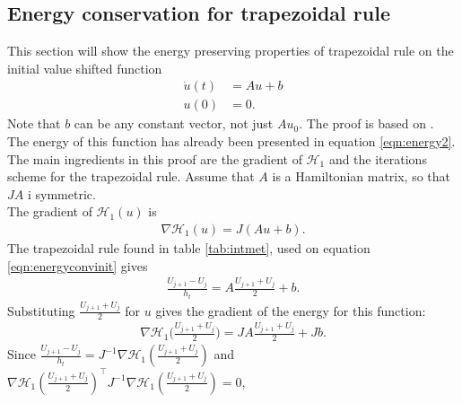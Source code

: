 \subsection{Energy conservation for trapezoidal rule} %
This section will show the energy preserving properties of trapezoidal rule on the initial value shifted function
\begin{equation}
\begin{aligned}
\dot{u}(t)& = Au + b \\
u(0)& = 0.
\end{aligned}
\label{eqn:energyconvinit}
\end{equation}
\noindent Note that $b$ can be any constant vector, not just $A u_0$. The proof is based on \cite{convtrap}.
The energy of this function has already been presented in equation \eqref{eqn:energy2}. The main ingredients in this proof are the gradient of $\mathcal{H}_1$ and the iterations scheme for the trapezoidal rule. Assume that $A$ is a Hamiltonian matrix, so that $JA$ i symmetric.\\ 
The gradient of $\mathcal{H}_1(u)$ is 
\begin{equation*}
\begin{aligned}
\nabla \mathcal{H}_1(u) = J (Au + b) .
\end{aligned}
\end{equation*}
\noindent The trapezoidal rule found in table \ref{tab:intmet}, used on equation \eqref{eqn:energyconvinit} gives 
\begin{equation*}
\begin{aligned}
\frac{U_{j+1} - U_j}{h_t} = A \frac{U_{j+1}  + U_j}{2} + b.
\end{aligned}
\end{equation*}
\noindent Substituting $\frac{U_{j+1}  + U_j}{2} $ for $u$ gives the gradient of the energy for this function:
\begin{equation*}
\begin{aligned}
\nabla \mathcal{H}_1 \Big(\frac{U_{j+1}  + U_j}{2}\Big) = JA \frac{U_{j+1}  + U_j}{2} + J b.
\end{aligned}
\end{equation*}
\noindent Since
$\frac{ U_{j+1} - U_j}{h_t} = J^{-1} \nabla \mathcal{H}_1( \frac{U_{j+1}  + U_j}{2} ) $
\noindent and
$\nabla \mathcal{H}_1(\frac{U_{j+1}  + U_j}{2})^\top J^{-1} \nabla \mathcal{H}_1(\frac{U_{j+1}  + U_j}{2}) = 0$,
